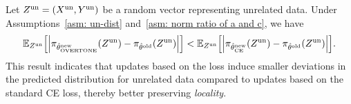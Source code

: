 \begin{theorem}
\label{thm: unrelated data}
Let $ Z^{\text{un}} = (X^{\text{un}}, Y^{\text{un}}) $ be a random vector representing unrelated data. Under Assumptions~\ref{asm: un-dist} and~\ref{asm: norm ratio of a and c}, we have
\begin{equation*}
    \mathbb{E}_{Z^{\text{un}}} \qty[\qty| \pi_{\hat{\theta}^{\text{new}}_{\text{OVERTONE}}} (Z^{\text{un}}) 
- \pi_{\hat{\theta}^{\text{old}}} (Z^{\text{un}}) | ] < \mathbb{E}_{Z^{\text{un}}} \qty[\qty| \pi_{\hat{\theta}^{\text{new}}_{\text{CE}}} (Z^{\text{un}}) 
- \pi_{\hat{\theta}^{\text{old}}} (Z^{\text{un}})| ].
\end{equation*}
This result indicates that updates based on the {\NAME} loss induce smaller deviations in the predicted distribution for unrelated data compared to updates based on the standard CE loss, thereby better preserving \textit{locality}.
\end{theorem}


